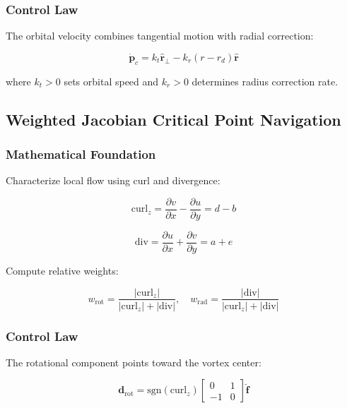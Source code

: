 \documentclass{article}
\begin{document}
\subsubsection{Control Law}

The orbital velocity combines tangential motion with radial correction:

\begin{equation}
\dot{\mathbf{p}}_c = k_t \hat{\mathbf{r}}_\perp - k_r(r - r_d)\hat{\mathbf{r}}
\end{equation}

where $k_t > 0$ sets orbital speed and $k_r > 0$ determines radius correction rate.

\subsection{Weighted Jacobian Critical Point Navigation}

\subsubsection{Mathematical Foundation}

Characterize local flow using curl and divergence:

\begin{equation}
\text{curl}_z = \frac{\partial v}{\partial x} - \frac{\partial u}{\partial y} = d - b
\end{equation}

\begin{equation}
\text{div} = \frac{\partial u}{\partial x} + \frac{\partial v}{\partial y} = a + e
\end{equation}

Compute relative weights:

\begin{equation}
w_\text{rot} = \frac{|\text{curl}_z|}{|\text{curl}_z| + |\text{div}|}, \quad 
w_\text{rad} = \frac{|\text{div}|}{|\text{curl}_z| + |\text{div}|}
\end{equation}

\subsubsection{Control Law}

The rotational component points toward the vortex center:

\begin{equation}
\mathbf{d}_\text{rot} = \text{sgn}(\text{curl}_z) \begin{bmatrix} 0 & 1 \\ -1 & 0 \end{bmatrix} \hat{\mathbf{f}}
\end{equation}
\end{document}
